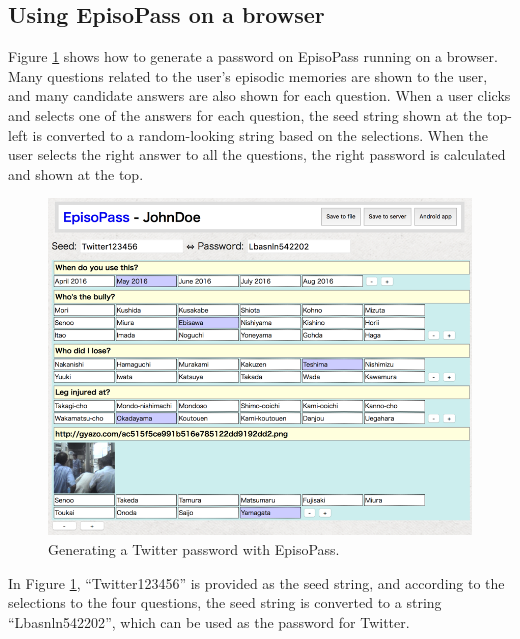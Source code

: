 \documentclass{sigchi}
\begin{document}
\subsection{Using EpisoPass on a browser}

Figure \ref{web1} shows how to generate a password
on EpisoPass running on a browser.
Many questions related to the user's episodic memories are shown to the user,
and many candidate answers are also shown for each question.
When a user clicks and selects one of the answers for each question,
the seed string shown at the top-left is converted to a random-looking string
based on the selections.
When the user selects the right answer to all the questions,
the right password is calculated and shown at the top.


\begin{figure}[t]
\centering
\includegraphics[width=1.0\columnwidth]{figures/c1bd6e7f67698c70978f528ccd2339d9}
\caption{Generating a Twitter password with EpisoPass.}
\label{web1}
\end{figure}

In Figure \ref{web1},
``\textsf{Twitter123456}'' is provided as the seed string,
and according to the selections to the four questions,
the seed string is converted to a string
``\textsf{Lbasnln542202}'',
which can be used as the password for Twitter.
\end{document}
